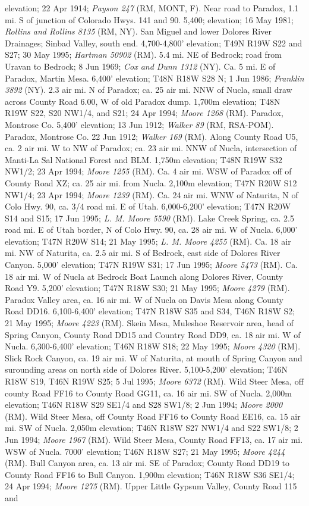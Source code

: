 elevation; 22 Apr 1914; \textit{Payson 247} (RM, MONT, F).  Near road to Paradox, 1.1 mi. S of junction of Colorado Hwys. 141 and 90. 5,400; elevation; 16 May 1981; \textit{Rollins and Rollins 8135} (RM, NY).  San Miguel and lower Dolores River Drainages; Sinbad Valley, south end. 4,700-4,800' elevation; T49N R19W S22 and S27; 30 May 1995; \textit{Hartman 50902} (RM).  5.4 mi. NE of Bedrock; road from Uravan to Bedrock; 8 Jun 1969; \textit{Cox and Dunn 1312} (NY).  Ca. 5 mi. E of Paradox, Martin Mesa. 6,400' elevation; T48N R18W S28 N; 1 Jun 1986; \textit{Franklin 3892} (NY).  2.3 air mi. N of Paradox; ca. 25 air mi. NNW of Nucla, small draw across County Road 6.00, W of old Paradox dump. 1,700m elevation; T48N R19W S22, S20 NW1/4, and S21; 24 Apr 1994; \textit{Moore 1268} (RM).  Paradox, Montrose Co. 5,400' elevation; 13 Jun 1912; \textit{Walker 89} (RM, RSA-POM).  Paradox, Montrose Co. 22 Jun 1912; \textit{Walker 169} (RM).  Along County Road U5, ca. 2 air mi. W to NW of Paradox; ca. 23 air mi. NNW of Nucla, intersection of Manti-La Sal National Forest and BLM. 1,750m elevation; T48N R19W S32 NW1/2; 23 Apr 1994; \textit{Moore 1255} (RM).  Ca. 4 air mi. WSW of Paradox off of County Road XZ; ca. 25 air mi. from Nucla. 2,100m elevation; T47N R20W S12 NW1/4; 23 Apr 1994; \textit{Moore 1239} (RM).  Ca. 24 air mi. WNW of Naturita, N of Colo Hwy. 90, ca. 3/4 road mi. E of Utah. 6,000-6,200' elevation; T47N R20W S14 and S15; 17 Jun 1995; \textit{L. M. Moore 5590} (RM).  Lake Creek Spring, ca. 2.5 road mi. E of Utah border, N of Colo Hwy. 90, ca. 28 air mi. W of Nucla. 6,000' elevation; T47N R20W S14; 21 May 1995; \textit{L. M. Moore 4255} (RM).  Ca. 18 air mi. NW of Naturita, ca. 2.5 air mi. S of Bedrock, east side of Dolores River Canyon. 5,000' elevation; T47N R19W S31; 17 Jun 1995; \textit{Moore 5473} (RM).  Ca. 18 air mi. W of Nucla at Bedrock Boat Launch along Dolores River, County Road Y9. 5,200' elevation; T47N R18W S30; 21 May 1995; \textit{Moore 4279} (RM).  Paradox Valley area, ca. 16 air mi. W of Nucla on Davis Mesa along County Road DD16. 6,100-6,400' elevation; T47N R18W S35 and S34, T46N R18W S2; 21 May 1995; \textit{Moore 4223} (RM).  Skein Mesa, Muleshoe Reservoir area, head of Spring Canyon, County Road DD15 and Country Road DD9, ca. 18 air mi. W of Nucla. 6,300-6,400' elevation; T46N R18W S18; 22 May 1995; \textit{Moore 4320} (RM).  Slick Rock Canyon, ca. 19 air mi. W of Naturita, at mouth of Spring Canyon and surounding areas on north side of Dolores River. 5,100-5,200' elevation; T46N R18W S19, T46N R19W S25; 5 Jul 1995; \textit{Moore 6372} (RM).  Wild Steer Mesa, off county Road FF16 to County Road GG11, ca. 16 air mi. SW of Nucla. 2,000m elevation; T46N R18W S29 SE1/4 and S28 SW1/8; 2 Jun 1994; \textit{Moore 2000} (RM).  Wild Steer Mesa, off County Road FF16 to County Road EE16, ca. 15 air mi. SW of Nucla. 2,050m elevation; T46N R18W S27 NW1/4 and S22 SW1/8; 2 Jun 1994; \textit{Moore 1967} (RM).  Wild Steer Mesa, County Road FF13, ca. 17 air mi. WSW of Nucla. 7000' elevation; T46N R18W S27; 21 May 1995; \textit{Moore 4244} (RM).  Bull Canyon area, ca. 13 air mi. SE of Paradox; County Road DD19 to County Road FF16 to Bull Canyon. 1,900m elevation; T46N R18W S36 SE1/4; 24 Apr 1994; \textit{Moore 1275} (RM).  Upper Little Gypsum Valley, County Road 115 and 